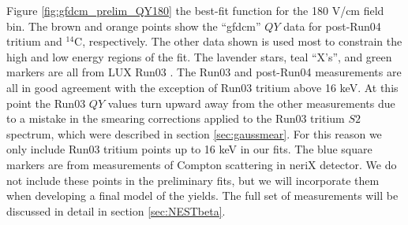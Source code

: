 Figure \ref{fig:gfdcm_prelim_QY180} the best-fit function for the 180 V/cm field bin. The brown and orange points show the ``gfdcm'' $QY$ data for post-Run04 tritium and $^{14}$C, respectively. The other data shown is used most to constrain the high and low energy regions of the fit. The lavender stars, teal ``X's'', and green markers are all from LUX Run03 \cite{lux_tritium, DQyields, Evanyields}. The Run03 and post-Run04 measurements are all in good agreement with the exception of Run03 tritium above 16 keV. At this point the Run03 $QY$ values turn upward away from the other measurements due to a mistake in the smearing corrections applied to the Run03 tritium $S2$ spectrum, which were described in section \ref{sec:gaussmear}. For this reason we only include Run03 tritium points up to 16 keV in our fits. The blue square markers are from measurements of Compton scattering in neriX detector\cite{nerix}. We do not include these points in the preliminary fits, but we will incorporate them when developing a final model of the yields. The full set of measurements will be discussed in detail in section \ref{sec:NESTbeta}.
